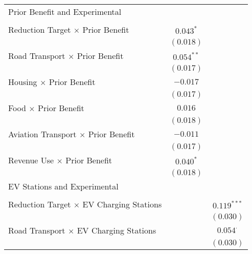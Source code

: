 \begin{center}
\begin{tiny}
\begin{longtable}{l@{} c@{} c@{}}
Prior Benefit and Experimental                         &                  &                  \\
                                                       &                  &                  \\
\quad Reduction Target $\times$ Prior Benefit          & $0.043^{*}$      &                  \\
                                                       & $(0.018)$        &                  \\
\quad Road Transport $\times$ Prior Benefit            & $0.054^{**}$     &                  \\
                                                       & $(0.017)$        &                  \\
\quad Housing $\times$ Prior Benefit                   & $-0.017$         &                  \\
                                                       & $(0.017)$        &                  \\
\quad Food $\times$ Prior Benefit                      & $0.016$          &                  \\
                                                       & $(0.018)$        &                  \\
\quad Aviation Transport $\times$ Prior Benefit        & $-0.011$         &                  \\
                                                       & $(0.017)$        &                  \\
\quad Revenue Use $\times$ Prior Benefit               & $0.040^{*}$      &                  \\
                                                       & $(0.018)$        &                  \\
EV Stations and Experimental                           &                  &                  \\
                                                       &                  &                  \\
\quad Reduction Target $\times$ EV Charging Stations   &                  & $0.119^{***}$    \\
                                                       &                  & $(0.030)$        \\
\quad Road Transport $\times$ EV Charging Stations     &                  & $0.054^{\cdot}$  \\
                                                       &                  & $(0.030)$        \\

\end{longtable}
\end{tiny}
\end{center}
